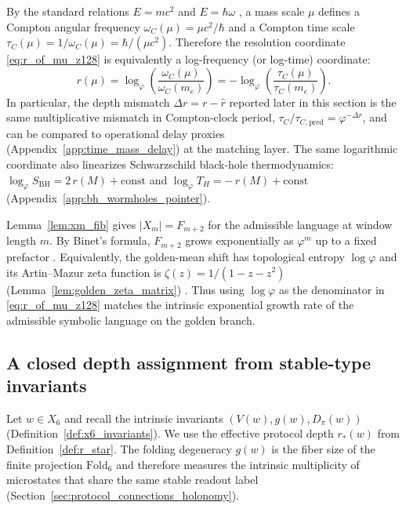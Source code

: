 \begin{remark}\label{rem:mass_as_compton_clock}
By the standard relations $E=mc^2$ and $E=\hbar\omega$ \cite{Einstein1905,NielsenChuang2010}, a mass scale $\mu$ defines a Compton angular frequency $\omega_C(\mu)=\mu c^2/\hbar$ and a Compton time scale $\tau_C(\mu)=1/\omega_C(\mu)=\hbar/(\mu c^2)$.
Therefore the resolution coordinate \eqref{eq:r_of_mu_z128} is equivalently a log-frequency (or log-time) coordinate:
\[
r(\mu)=\log_\varphi\!\left(\frac{\omega_C(\mu)}{\omega_C(m_e)}\right)
=-\log_\varphi\!\left(\frac{\tau_C(\mu)}{\tau_C(m_e)}\right).
\]
In particular, the depth mismatch $\Delta r=r-\widehat r$ reported later in this section is the same multiplicative mismatch in Compton-clock period, $\tau_C/\tau_{C,\mathrm{pred}}=\varphi^{-\Delta r}$, and can be compared to operational delay proxies (Appendix~\ref{app:time_mass_delay}) at the matching layer.
The same logarithmic coordinate also linearizes Schwarzschild black-hole thermodynamics: $\log_\varphi S_{\mathrm{BH}}=2\,r(M)+\text{const}$ and $\log_\varphi T_H=-\,r(M)+\text{const}$ (Appendix~\ref{app:bh_wormholes_pointer}).
\end{remark}

\begin{remark}\label{rem:phi_base_entropy}
Lemma~\ref{lem:xm_fib} gives $|X_m|=F_{m+2}$ for the admissible language at window length $m$.
By Binet's formula, $F_{m+2}$ grows exponentially as $\varphi^{m}$ up to a fixed prefactor \cite{HardyWright2008}.
Equivalently, the golden-mean shift has topological entropy $\log\varphi$ and its Artin--Mazur zeta function is $\zeta(z)=1/(1-z-z^2)$ (Lemma~\ref{lem:golden_zeta_matrix}) \cite{LindMarcus1995}.
Thus using $\log\varphi$ as the denominator in \eqref{eq:r_of_mu_z128} matches the intrinsic exponential growth rate of the admissible symbolic language on the golden branch.
\end{remark}

\subsection{A closed depth assignment from stable-type invariants}
\label{subsec:mass_depth_assignment}

Let $w\in X_6$ and recall the intrinsic invariants $(V(w),g(w),D_\pi(w))$ (Definition~\ref{def:x6_invariants}).
We use the effective protocol depth $r_\ast(w)$ from Definition~\ref{def:r_star}.
The folding degeneracy $g(w)$ is the fiber size of the finite projection $\mathrm{Fold}_6$ and therefore measures the intrinsic multiplicity of microstates that share the same stable readout label (Section~\ref{sec:protocol_connections_holonomy}).


